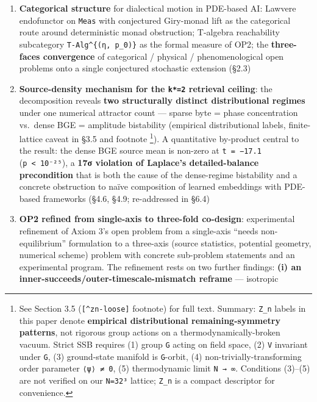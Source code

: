 \documentclass[
]{article}
\begin{document}
\begin{enumerate}
\def\labelenumi{\arabic{enumi}.}
\item
  \textbf{Categorical structure} for dialectical motion in PDE-based AI:
  Lawvere endofunctor on \texttt{Meas} with conjectured Giry-monad lift
  as the categorical route around deterministic monad obstruction;
  T-algebra reachability subcategory \texttt{T-Alg\^{}\{(η,\ p\_0)\}} as
  the formal measure of OP2; the \textbf{three-faces convergence} of
  categorical / physical / phenomenological open problems onto a single
  conjectured stochastic extension (§2.3)
\item
  \textbf{Source-density mechanism for the \texttt{k*=2} retrieval
  ceiling}: the decomposition reveals \textbf{two structurally distinct
  distributional regimes} under one numerical attractor count --- sparse
  byte = phase concentration vs.~dense BGE = amplitude bistability
  (empirical distributional labels, finite-lattice caveat in §3.5 and
  footnote \footnote{See Section 3.5 (\texttt{{[}\^{}zn-loose{]}}
    footnote) for full text. Summary: \texttt{Z\_n} labels in this paper
    denote \textbf{empirical distributional remaining-symmetry
    patterns}, not rigorous group actions on a thermodynamically-broken
    vacuum. Strict SSB requires (1) group \texttt{G} acting on field
    space, (2) \texttt{V} invariant under \texttt{G}, (3) ground-state
    manifold is \texttt{G}-orbit, (4) non-trivially-transforming order
    parameter \texttt{⟨ψ⟩\ ≠\ 0}, (5) thermodynamic limit
    \texttt{N\ →\ ∞}. Conditions (3)--(5) are not verified on our
    \texttt{N=32³} lattice; \texttt{Z\_n} is a compact descriptor for
    convenience.}). A quantitative by-product central to the result: the
  dense BGE source mean is non-zero at \texttt{t\ =\ −17.1}
  (\texttt{p\ \textless{}\ 10⁻²⁵}), a \textbf{17σ violation of Laplace's
  detailed-balance precondition} that is both the cause of the
  dense-regime bistability and a concrete obstruction to naïve
  composition of learned embeddings with PDE-based frameworks (§4.6,
  §4.9; re-addressed in §6.4)
\item
  \textbf{OP2 refined from single-axis to three-fold co-design}:
  experimental refinement of Axiom 3's open problem from a single-axis
  ``needs non-equilibrium'' formulation to a three-axis (source
  statistics, potential geometry, numerical scheme) problem with
  concrete sub-problem statements and an experimental program. The
  refinement rests on two further findings: \textbf{(i) an
  inner-succeeds/outer-timescale-mismatch reframe} --- isotropic

\end{enumerate}
\end{document}
